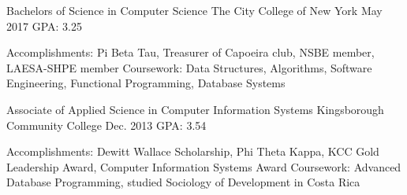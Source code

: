 \begin{cventries}
\iftrue
  \cventry
    {Bachelors of Science in Computer Science} %
    {The City College of New York} %
    {May 2017} %
    {GPA: 3.25} %
	{
	  \begin{cvskills} %
		\cvskill
		  {Accomplishments:} %
		  {Pi Beta Tau, Treasurer of Capoeira club, NSBE member, LAESA-SHPE member} %
		\cvskill
		  {Coursework:} %
		  {Data Structures, Algorithms, Software Engineering, Functional Programming, Database Systems} %
	  \end{cvskills}
	} %
\fi
\iftrue
  \cventry
    {Associate of Applied Science in Computer Information Systems} %
    {Kingsborough Community College} %
    {Dec. 2013} %
    {GPA: 3.54} %
    {
	  \begin{cvskills} %
		\cvskill
		  {Accomplishments:} %
		  {Dewitt Wallace Scholarship, Phi Theta Kappa, KCC Gold Leadership Award, Computer Information Systems Award} %
		\cvskill
		  {Coursework:} %
		  {Advanced Database Programming, studied Sociology of Development in Costa Rica} %
	  \end{cvskills}
	}
\fi
\iffalse
  \cventry
    {Associate of Occupational Studies in Computer Programming} %
    {Wood Tobe-Coburn School} %
    {Aug. 2008} %
    {GPA: 3.6} %
    {
	  \begin{cvskills} %
		\cvskill
		  {Coursework:} %
		  {Visual Basic for Applications, Server Administration} %
	  \end{cvskills}
	}
\fi
\iffalse
\begin{cvskills} %
		\cvskill
		  {Coursework:} %
		  {Data Structures, Algorithms, Software Engineering, Functional Programming, Database Systems} %
\end{cvskills}
\fi
\end{cventries}
